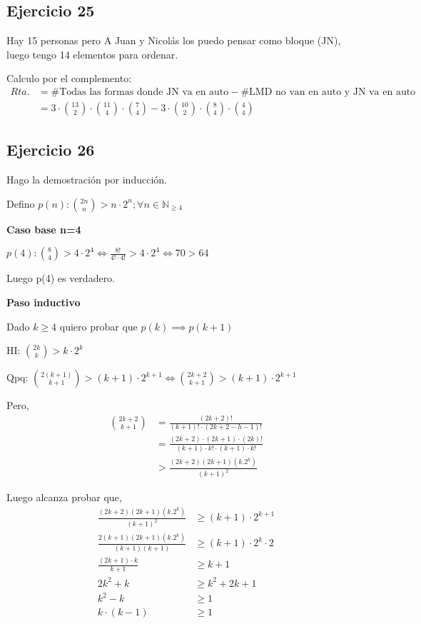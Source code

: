 \subsection{Ejercicio 25}

Hay 15 personas pero A Juan y Nicolás los puedo pensar como bloque (JN), luego tengo 14 elementos para ordenar.

Calculo por el complemento: 
\begin{align*}
    Rta. &= \# \text{Todas las formas donde JN va en auto} - \# \text{LMD no van en auto y JN va en auto} \\
    &= 3 \cdot \binom{13}{2} \cdot \binom{11}{4} \cdot \binom{7}{4} - 3 \cdot \binom{10}{2} \cdot \binom{8}{4} \cdot \binom{4}{4}
\end{align*}

\subsection{Ejercicio 26}
Hago la demostración por inducción.

Defino $ p(n): \binom{2n}{n} > n\cdot 2^n; \forall n \in \mathbb{N}_{\geq 4} $

\textbf{Caso base n=4}

$ p(4): \binom{8}{4} > 4 \cdot 2^4 \iff \frac{8!}{4! \cdot 4!} > 4 \cdot 2^4 \iff 70 > 64 $

Luego p(4) es verdadero.

\textbf{Paso inductivo}

Dado $ k \geq 4 $ quiero probar que $ p(k) \implies p(k+1) $

HI: $ \binom{2k}{k} > k \cdot 2^k $

Qpq: $\binom{2(k+1)}{k+1} > (k+1) \cdot 2^{k+1} \iff \binom{2k+2}{k+1} > (k+1) \cdot 2^{k+1} $

Pero,
\begin{align*}
    \binom{2k+2}{k+1} &= \frac{(2k+2)!}{(k+1)! \cdot (2k+2-h-1)!} \\
    &= \frac{(2k+2) \cdot (2k+1) \cdot (2k)!}{(k+1)\cdot k! \cdot (k+1) \cdot k!} \\
    &> \frac{(2k+2)(2k+1)(k.2^k)}{(k+1)^2}
\end{align*}

Luego alcanza probar que,
\begin{align*}
    \frac{(2k+2)(2k+1)(k.2^k)}{(k+1)^2} &\geq (k+1)\cdot 2^{k+1} \\
    \frac{2(k+1)(2k+1)(k.2^k)}{(k+1)(k+1)} &\geq (k+1)\cdot 2^{k} \cdot 2 \\
    \frac{(2k+1)\cdot k}{k+1} &\geq k+1 \\
    2k^2 + k &\geq k^2 + 2k +1 \\
    k^2 - k &\geq 1 \\
    k \cdot (k-1) &\geq 1 \\
\end{align*}

